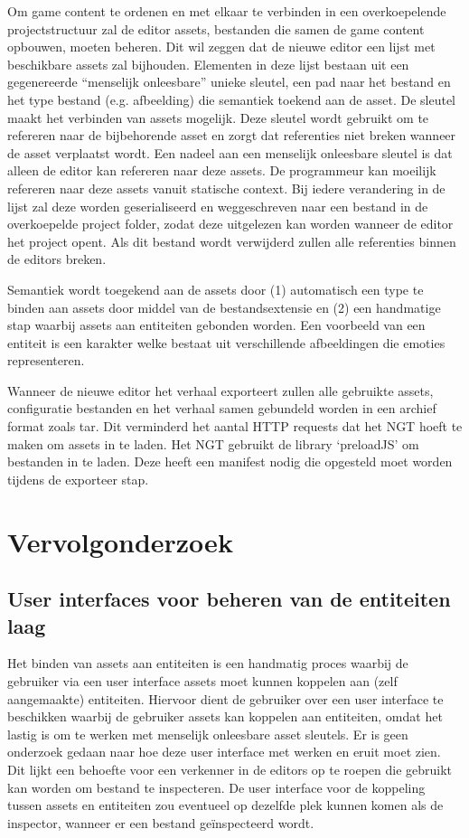 Om game content te ordenen en met elkaar te verbinden in een overkoepelende projectstructuur zal de editor assets, bestanden die samen de game content opbouwen, moeten beheren. Dit wil zeggen dat de nieuwe editor een lijst met beschikbare assets zal bijhouden. Elementen in deze lijst bestaan uit een gegenereerde “menselijk onleesbare” unieke sleutel, een pad naar het bestand en het type bestand (e.g. afbeelding) die semantiek toekend aan de asset. De sleutel maakt het verbinden van assets mogelijk. Deze sleutel wordt gebruikt om te refereren naar de bijbehorende asset en zorgt dat referenties niet breken wanneer de asset verplaatst wordt. Een nadeel aan een menselijk onleesbare sleutel is dat alleen de editor kan refereren naar deze assets. De programmeur kan moeilijk refereren naar deze assets vanuit statische context. Bij iedere verandering in de lijst zal deze worden geserialiseerd en weggeschreven naar een bestand in de overkoepelde project folder, zodat deze uitgelezen kan worden wanneer de editor het project opent. Als dit bestand wordt verwijderd zullen alle referenties binnen de editors breken.

Semantiek wordt toegekend aan de assets door (1) automatisch een type te binden aan assets door middel van de bestandsextensie en (2) een handmatige stap waarbij assets aan entiteiten gebonden worden. Een voorbeeld van een entiteit is een karakter welke bestaat uit verschillende afbeeldingen die emoties representeren.

Wanneer de nieuwe editor het verhaal exporteert zullen alle gebruikte assets, configuratie bestanden en het verhaal samen gebundeld worden in een archief format zoals tar. Dit verminderd het aantal HTTP requests dat het NGT hoeft te maken om assets in te laden. Het NGT gebruikt de library ‘preloadJS’ om bestanden in te laden. Deze heeft een manifest nodig die opgesteld moet worden tijdens de exporteer stap.

\section{Vervolgonderzoek}
\subsection{User interfaces voor beheren van de entiteiten laag}
Het binden van assets aan entiteiten is een handmatig proces waarbij de gebruiker via een user interface assets moet kunnen koppelen aan (zelf aangemaakte) entiteiten. Hiervoor dient de gebruiker over een user interface te beschikken waarbij de gebruiker assets kan koppelen aan entiteiten, omdat het lastig is om te werken met menselijk onleesbare asset sleutels. Er is geen onderzoek gedaan naar hoe deze user interface met werken en eruit moet zien. Dit lijkt een behoefte voor een verkenner in de editors op te roepen die gebruikt kan worden om bestand te inspecteren. De user interface voor de koppeling tussen assets en entiteiten zou eventueel op dezelfde plek kunnen komen als de inspector, wanneer er een bestand geïnspecteerd wordt.

